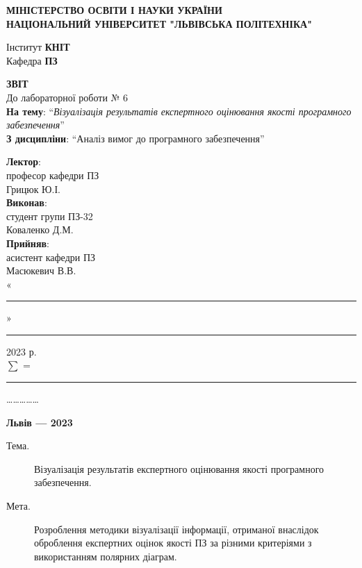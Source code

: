 \documentclass[14pt]{extreport}
\newcommand\subject{Аналіз вимог до програмного забезпечення}
\newcommand\lecturer{професор кафедри ПЗ\\Грицюк Ю.І.}
\newcommand\teacher{асистент кафедри ПЗ\\Масюкевич В.В.}
\newcommand\mygroup{ПЗ-32}
\newcommand\lab{6}
\newcommand\theme{Візуалізація результатів експертного оцінювання якості
	програмного забезпечення}
\newcommand\purpose{Розроблення методики візуалізації інформації, отриманої
	внаслідок оброблення експертних оцінок якості ПЗ за різними критеріями з
	використанням полярних діаграм}
\begin{document}
\begin{normalsize}
	\begin{titlepage}
		\thispagestyle{empty}
		\begin{center}
			\textbf{МІНІСТЕРСТВО ОСВІТИ І НАУКИ УКРАЇНИ\\
				НАЦІОНАЛЬНИЙ УНІВЕРСИТЕТ "ЛЬВІВСЬКА ПОЛІТЕХНІКА"}
		\end{center}
		\begin{flushright}
			Інститут \textbf{КНІТ}\\
			Кафедра \textbf{ПЗ}
		\end{flushright}
		\vspace{140pt}
		\begin{center}
			\textbf{ЗВІТ}\\
			\vspace{10pt}
			До лабораторної роботи № \lab\\
			\textbf{На тему}: “\textit{\theme}”\\
			\textbf{З дисципліни}: “\subject”
		\end{center}
		\vspace{40pt}
		\begin{flushright}
			
			\textbf{Лектор}:\\
			\lecturer\\
			\vspace{10pt}
			\textbf{Виконав}:\\
			
			студент групи \mygroup\\
			Коваленко Д.М.\\
			\vspace{10pt}
			\textbf{Прийняв}:\\
			
			\teacher\\
			
			\vspace{28pt}
			«\rule{1cm}{0.15mm}» \rule{1.5cm}{0.15mm} 2023 р.\\
			$\sum$ = \rule{1cm}{0.15mm}……………\\
			
		\end{flushright}
		\vspace{\fill}
		\begin{center}
			\textbf{Львів — 2023}
		\end{center}
	\end{titlepage}
		
	\begin{description}
		\item[Тема.] \theme.
		\item[Мета.] \purpose.
	\end{description}


\end{normalsize}
\end{document}
